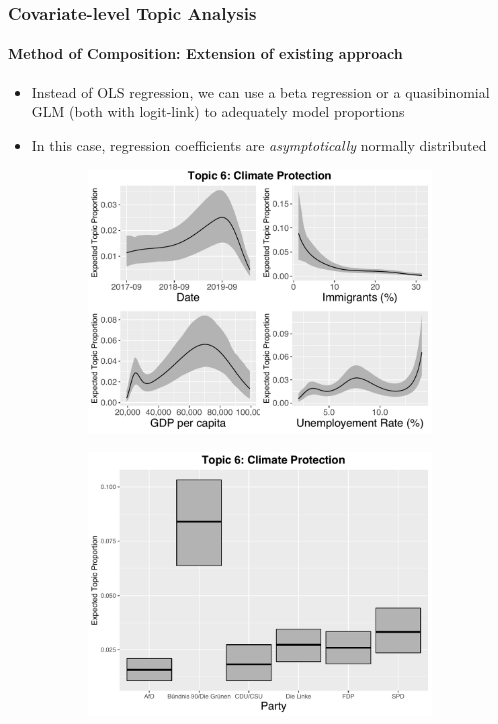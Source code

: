 \documentclass[xcolor=dvipsnames]{beamer}
\begin{document}
\begin{frame}
\frametitle{Covariate-level Topic Analysis}
\framesubtitle{Method of Composition: Extension of existing approach}
\begin{itemize}
\item Instead of OLS regression, we can use a beta regression or a quasibinomial GLM (both with logit-link) to adequately model proportions
\item In this case, regression coefficients are \textit{asymptotically} normally distributed
\end{itemize}
\begin{figure}[h!]
  \centering
  \captionsetup{justification=centering,margin=2cm}
  \begin{subfigure}[b]{0.4\linewidth}
    \includegraphics[width=\linewidth]{../../plots/presentation/quasi_t6_cont.pdf}
  \end{subfigure}
  \begin{subfigure}[b]{0.4\linewidth}
    \includegraphics[width=\linewidth]{../../plots/presentation/quasi_t6_cat.pdf}
  \end{subfigure}
\end{figure}
\end{frame}
\end{document}
